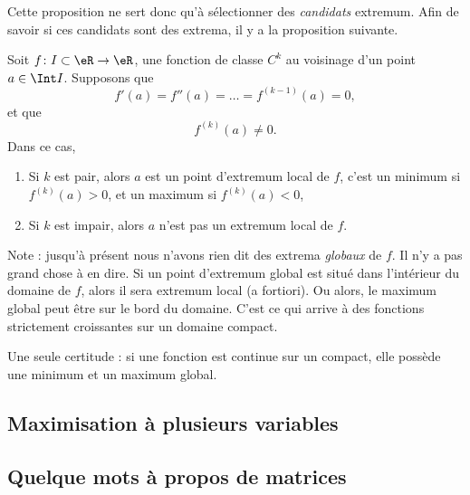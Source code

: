 Cette proposition ne sert donc qu'à sélectionner des \emph{candidats} extremum. Afin de savoir si ces candidats sont des extrema, il y a la proposition suivante.
\begin{proposition}
Soit $f\colon I\subset \eR\to \eR$, une fonction de classe $C^k$ au voisinage d'un point $a\in\Int I$. Supposons que
\begin{equation}
    f'(a)=f''(a)=\ldots=f^{(k-1)}(a)=0,
\end{equation}
et que
\begin{equation}
    f^{(k)}(a)\neq 0.
\end{equation}
Dans ce cas,
\begin{enumerate}

\item
Si $k$ est pair, alors $a$ est un point d'extremum local de $f$, c'est un minimum si $f^{(k)}(a)>0$, et un maximum si $f^{(k)}(a)<0$,
\item
Si $k$ est impair, alors $a$ n'est pas un extremum local de $f$.

\end{enumerate}
\end{proposition}

Note : jusqu'à présent nous n'avons rien dit des extrema \emph{globaux} de $f$. Il n'y a pas grand chose à en dire. Si un point d'extremum global est situé dans l'intérieur du domaine de $f$, alors il sera extremum local (a fortiori). Ou alors, le maximum global peut être sur le bord du domaine. C'est ce qui arrive à des fonctions strictement croissantes sur un domaine compact.

Une seule certitude : si une fonction est continue sur un compact, elle possède une minimum et un maximum global.

                    \subsection{Maximisation à plusieurs variables}

                    \subsection{Quelque mots à propos de matrices}

